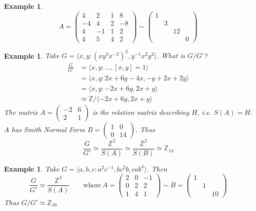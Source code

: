 \documentclass[a4paper,10pt]{article}
\newcommand{\ZZ}{\mathbb{Z}}
\newtheorem{eg}[thm]{Example}
\begin{document}
\begin{eg}
\[ A = \begin{pmatrix} 4 & 2 & 1 & 8 \\
                    -4 & 4 & 2 & -8 \\
                    4 & -1 & 1 & 2 \\
                    4 & 5 & 4 & 2
 \end{pmatrix} \sim \begin{pmatrix} 1 \\
                                    & 3 \\
                                    & & 12 \\
                                    & & & 0 
 \end{pmatrix}
 \]
\end{eg}

\begin{eg}
Take $G = \langle x,y : (xy^3x^{-2})^2, y^{-1} x^2 y^2 \rangle$. What is $G / G'$?
\begin{align*}
\frac{G}{G'} &= \langle x,y : \dots, [x,y] = 1 \rangle \\
             &= \langle x,y : 2x + 6y - 4x, -y + 2x + 2y \rangle  \\
             &= \langle x,y : -2x + 6y, 2x + y \rangle \\
             &\simeq \ZZ / \langle -2x + 6y, 2x + y \rangle 
\end{align*}
The matrix $A = \begin{pmatrix} -2 & 6 \\ 2 & 1 \end{pmatrix}$ is the relation matrix describing $H$, i.e. $S(A) = H$. $A$ has Smith Normal Form $B = \begin{pmatrix} 1 & 0 \\ 0 & 14 \end{pmatrix}$. Thus
\[ \frac{G}{G'} \simeq \frac{\ZZ^2}{S(A)} \simeq \frac{\ZZ^2}{S(B)} \simeq \ZZ_{14} \] 
\end{eg}

\begin{eg}
Take $G = \langle a,b,c : a^2c^{-1}, bc^2b, cab^4 \rangle$. Then 
\[ \frac{G}{G'} \simeq \frac{\ZZ^3}{S(A)} \qquad \text{where} \ A = \begin{pmatrix} 2 & 0 & -1 \\
  0 & 2 & 2 \\ 1 & 4 & 1
 \end{pmatrix} \sim B = \begin{pmatrix} 1 \\ & 1 \\ & & 10 \end{pmatrix} \]
 Thus $G / G' \simeq \ZZ_{10}$
\end{eg}
\end{document}
